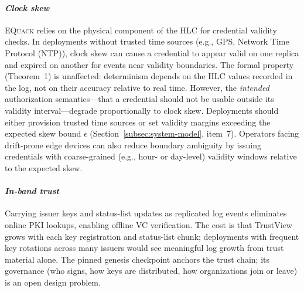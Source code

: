 \documentclass[10pt,journal,compsoc]{IEEEtran}
\newcommand{\equack}{\textsc{EQuack}}
\begin{document}
\paragraph*{\textit{Clock skew}}
\equack{} relies on the physical component of the HLC for credential validity checks. In deployments without trusted time sources (e.g., GPS, Network Time Protocol (NTP)), clock skew can cause a credential to appear valid on one replica and expired on another for events near validity boundaries. The formal property (Theorem~1) is unaffected: determinism depends on the HLC values recorded in the log, not on their accuracy relative to real time. However, the \emph{intended} authorization semantics---that a credential should not be usable outside its validity interval---degrade proportionally to clock skew. Deployments should either provision trusted time sources or set validity margins exceeding the expected skew bound $\epsilon$ (Section~\ref{subsec:system-model}, item~7). Operators facing drift-prone edge devices can also reduce boundary ambiguity by issuing credentials with coarse-grained (e.g., hour- or day-level) validity windows relative to the expected skew.

\paragraph*{\textit{In-band trust}}
Carrying issuer keys and status-list updates as replicated log events eliminates online PKI lookups, enabling offline VC verification. The cost is that TrustView grows with each key registration and status-list chunk; deployments with frequent key rotations across many issuers would see meaningful log growth from trust material alone. The pinned genesis checkpoint anchors the trust chain; its governance (who signs, how keys are distributed, how organizations join or leave) is an open design problem.
\end{document}
